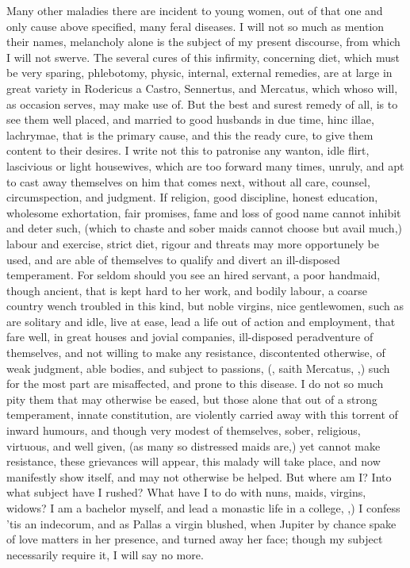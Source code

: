 {Many other maladies there are incident to young women, out of that one
and only cause above specified, many feral diseases. I will not so much
as mention their names, melancholy alone is the subject of my present
discourse, from which I will not swerve. The several cures of this
infirmity, concerning diet, which must be very sparing, phlebotomy,
physic, internal, external remedies, are at large in great variety in
 Rodericus a Castro, Sennertus, and Mercatus, which whoso will,
as occasion serves, may make use of. But the best and surest remedy of
all, is to see them well placed, and married to good husbands in due
time, hinc illae, lachrymae, that is the primary cause, and this the
ready cure, to give them content to their desires. I write not this to
patronise any wanton, idle flirt, lascivious or light housewives, which
are too forward many times, unruly, and apt to cast away themselves on
him that comes next, without all care, counsel, circumspection, and
judgment. If religion, good discipline, honest education, wholesome
exhortation, fair promises, fame and loss of good name cannot inhibit
and deter such, (which to chaste and sober maids cannot choose but
avail much,) labour and exercise, strict diet, rigour and threats may
more opportunely be used, and are able of themselves to qualify and
divert an ill-disposed temperament. For seldom should you see an hired
servant, a poor handmaid, though ancient, that is kept hard to her
work, and bodily labour, a coarse country wench troubled in this kind,
but noble virgins, nice gentlewomen, such as are solitary and idle,
live at ease, lead a life out of action and employment, that fare well,
in great houses and jovial companies, ill-disposed peradventure of
themselves, and not willing to make any resistance, discontented
otherwise, of weak judgment, able bodies, and subject to passions,
(, saith Mercatus, ,) such for the most part are misaffected, and prone to
this disease. I do not so much pity them that may otherwise be eased,
but those alone that out of a strong temperament, innate constitution,
are violently carried away with this torrent of inward humours, and
though very modest of themselves, sober, religious, virtuous, and well
given, (as many so distressed maids are,) yet cannot make resistance,
these grievances will appear, this malady will take place, and now
manifestly show itself, and may not otherwise be helped. But where am
I? Into what subject have I rushed? What have I to do with nuns, maids,
virgins, widows? I am a bachelor myself, and lead a monastic life in a
college, ,) I confess 'tis an
indecorum, and as Pallas a virgin blushed, when Jupiter by chance spake
of love matters in her presence, and turned away her face; 
though my subject necessarily require it, I will say no more.

}
